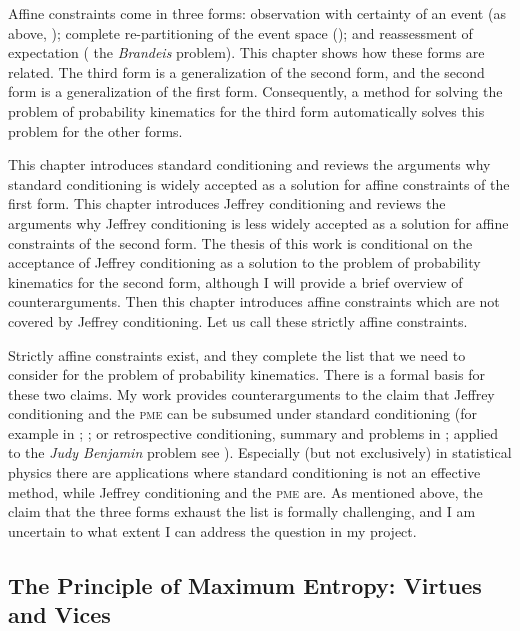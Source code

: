 \documentclass[11pt]{article}
\begin{document}
Affine constraints come in three forms: observation with certainty of
an event (as above, ); complete re-partitioning of the event space (); and reassessment of
expectation ( the \emph{Brandeis} problem). This chapter shows how
these forms are related. The third form is a generalization of the
second form, and the second form is a generalization of the first
form. Consequently, a method for solving the problem of probability
kinematics for the third form automatically solves this problem for
the other forms.

This chapter introduces standard conditioning and reviews the
arguments why standard conditioning is widely accepted as a solution
for affine constraints of the first form. This chapter introduces
Jeffrey conditioning and reviews the arguments why Jeffrey
conditioning is less widely accepted as a solution for affine
constraints of the second form. The thesis of this work is conditional
on the acceptance of Jeffrey conditioning as a solution to the problem
of probability kinematics for the second form, although I will provide
a brief overview of counterarguments. Then this chapter introduces
affine constraints which are not covered by Jeffrey conditioning. Let
us call these strictly affine constraints.

Strictly affine constraints exist, and they complete the list that we
need to consider for the problem of probability kinematics. There is a
formal basis for these two claims. My work provides counterarguments
to the claim that Jeffrey conditioning and the \textsc{pme} can be
subsumed under standard conditioning (for example in
; ; or retrospective
conditioning, summary and problems in
; applied to the \emph{Judy Benjamin}
problem see ). Especially (but not
exclusively) in statistical physics there are applications where
standard conditioning is not an effective method, while Jeffrey
conditioning and the \textsc{pme} are. As mentioned above, the claim
that the three forms exhaust the list is formally challenging, and I
am uncertain to what extent I can address the question in my project.

\subsection{The Principle of Maximum Entropy: Virtues and Vices}
\label{ThePrincipleOfMaximumEntropyVirtuesAndVices}
\end{document}
